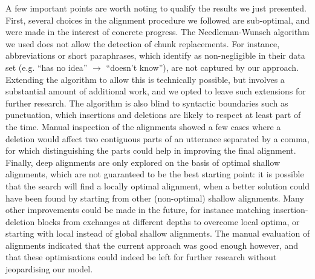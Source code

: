 \documentclass[a4paper,fleqn]{cas-dc}
\begin{document}
A few important points are worth noting to qualify the results we just
presented. First, several choices in the alignment procedure we followed
are sub-optimal, and were made in the interest of concrete progress. The
Needleman-Wunsch algorithm we used does not allow the detection of chunk
replacements. For instance, abbreviations or short paraphrases, which
\citet{lauf_analyzing_2013} identify as non-negligible in their data
set (e.g. \enquote{has no idea} \(\rightarrow\) \enquote{doesn't know}),
are not captured by our approach. Extending the algorithm to allow this
is technically possible, but involves a substantial amount of additional
work, and we opted to leave such extensions for further research. The
algorithm is also blind to syntactic boundaries such as punctuation,
which insertions and deletions are likely to respect at least part of
the time. Manual inspection of the alignments showed a few cases where a
deletion would affect two contiguous parts of an utterance separated by
a comma, for which distinguishing the parts could help in improving the
final alignment. Finally, deep alignments are only explored on the basis
of optimal shallow alignments, which are not guaranteed to be the best
starting point: it is possible that the search will find a locally
optimal alignment, when a better solution could have been found by
starting from other (non-optimal) shallow alignments. Many other
improvements could be made in the future, for instance matching
insertion-deletion blocks from exchanges at different depths to overcome
local optima, or starting with local instead of global shallow
alignments. The manual evaluation of alignments indicated that the
current approach was good enough however, and that these optimisations
could indeed be left for further research without jeopardising our
model.
\end{document}
